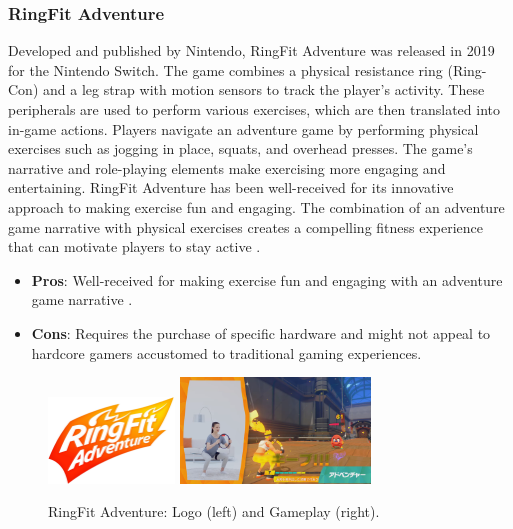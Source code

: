 \documentclass[12pt]{article}
\begin{document}
\subsubsection{RingFit Adventure}
Developed and published by Nintendo, RingFit Adventure was released in 2019 for the Nintendo Switch. The game combines a physical resistance ring (Ring-Con) and a leg strap with motion sensors to track the player’s activity. These peripherals are used to perform various exercises, which are then translated into in-game actions. Players navigate an adventure game by performing physical exercises such as jogging in place, squats, and overhead presses. The game’s narrative and role-playing elements make exercising more engaging and entertaining. RingFit Adventure has been well-received for its innovative approach to making exercise fun and engaging. The combination of an adventure game narrative with physical exercises creates a compelling fitness experience that can motivate players to stay active \cite{ring2021}.
\begin{itemize}
\item \textbf{Pros}: Well-received for making exercise fun and engaging with an adventure game narrative \cite{jiang2022}.
\item \textbf{Cons}: Requires the purchase of specific hardware and might not appeal to hardcore gamers accustomed to traditional gaming experiences.
\end{itemize}
\begin{figure}[ht]
\centering
\includegraphics[width=0.3\textwidth]{logo-ring.jpg}
\includegraphics[width=0.45\textwidth]{market-ring.png}
\caption{RingFit Adventure: Logo (left) and Gameplay (right).}
\end{figure}
\end{document}
